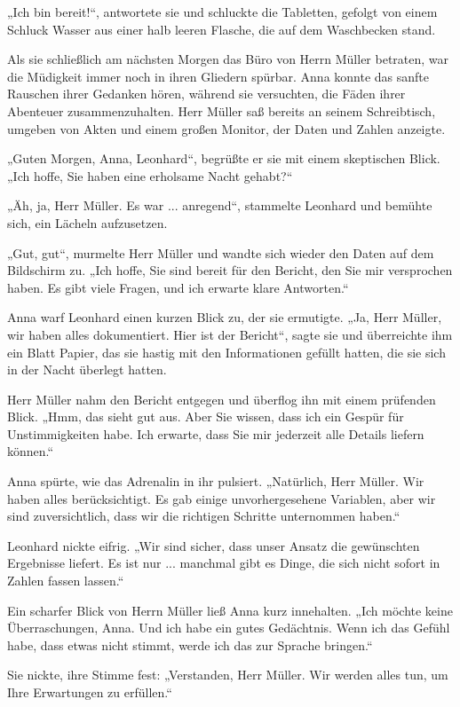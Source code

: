 \documentclass[
]{article}
\begin{document}
„Ich bin bereit!{\kern0pt}``, antwortete sie und schluckte die
Tabletten, gefolgt von einem Schluck Wasser aus einer halb leeren
Flasche, die auf dem Waschbecken stand.

Als sie schließlich am nächsten Morgen das Büro von Herrn Müller
betraten, war die Müdigkeit immer noch in ihren Gliedern spürbar. Anna
konnte das sanfte Rauschen ihrer Gedanken hören, während sie versuchten,
die Fäden ihrer Abenteuer zusammenzuhalten. Herr Müller saß bereits an
seinem Schreibtisch, umgeben von Akten und einem großen Monitor, der
Daten und Zahlen anzeigte.

„Guten Morgen, Anna, Leonhard``, begrüßte er sie mit einem skeptischen
Blick. „Ich hoffe, Sie haben eine erholsame Nacht gehabt?{\kern0pt}``

„Äh, ja, Herr Müller. Es war ... anregend``, stammelte Leonhard und
bemühte sich, ein Lächeln aufzusetzen.

„Gut, gut``, murmelte Herr Müller und wandte sich wieder den Daten auf
dem Bildschirm zu. „Ich hoffe, Sie sind bereit für den Bericht, den Sie
mir versprochen haben. Es gibt viele Fragen, und ich erwarte klare
Antworten.``

Anna warf Leonhard einen kurzen Blick zu, der sie ermutigte. „Ja, Herr
Müller, wir haben alles dokumentiert. Hier ist der Bericht``, sagte sie
und überreichte ihm ein Blatt Papier, das sie hastig mit den
Informationen gefüllt hatten, die sie sich in der Nacht überlegt hatten.

Herr Müller nahm den Bericht entgegen und überflog ihn mit einem
prüfenden Blick. „Hmm, das sieht gut aus. Aber Sie wissen, dass ich ein
Gespür für Unstimmigkeiten habe. Ich erwarte, dass Sie mir jederzeit
alle Details liefern können.``

Anna spürte, wie das Adrenalin in ihr pulsiert. „Natürlich, Herr Müller.
Wir haben alles berücksichtigt. Es gab einige unvorhergesehene
Variablen, aber wir sind zuversichtlich, dass wir die richtigen Schritte
unternommen haben.``

Leonhard nickte eifrig. „Wir sind sicher, dass unser Ansatz die
gewünschten Ergebnisse liefert. Es ist nur ... manchmal gibt es Dinge,
die sich nicht sofort in Zahlen fassen lassen.``

Ein scharfer Blick von Herrn Müller ließ Anna kurz innehalten. „Ich
möchte keine Überraschungen, Anna. Und ich habe ein gutes Gedächtnis.
Wenn ich das Gefühl habe, dass etwas nicht stimmt, werde ich das zur
Sprache bringen.``

Sie nickte, ihre Stimme fest: „Verstanden, Herr Müller. Wir werden alles
tun, um Ihre Erwartungen zu erfüllen.``
\end{document}
